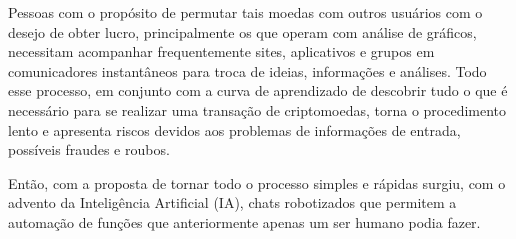 Pessoas com o propósito de permutar tais moedas com outros usuários com o desejo de obter lucro, principalmente os que operam com análise de gráficos, necessitam acompanhar frequentemente sites, aplicativos e grupos em comunicadores instantâneos para troca de ideias, informações e análises. Todo esse processo, em conjunto com a curva de aprendizado de descobrir tudo o que é necessário para se realizar uma transação de criptomoedas, torna o procedimento lento e apresenta riscos devidos aos problemas de informações de entrada, possíveis fraudes e roubos. 

Então, com a proposta de tornar todo o processo simples e rápidas surgiu, com o advento da Inteligência Artificial (IA), chats robotizados que permitem a automação de funções que anteriormente apenas um ser humano podia fazer.








